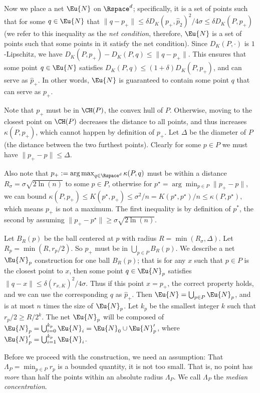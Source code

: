 \documentclass[11pt]{myclass}
\begin{document}
Now we place a net $\Eu{N}$ on $\Rspace^d$; specifically, it is a set of points such that for some $q \in \Eu{N}$ that
$\|q - p_+\| \leq \delta D_K(p_+,\hat p_2)^2/4\sigma \leq \delta D_K(P,p_+)$ (we refer to this inequality as the \emph{net condition}, therefore, $\Eu{N}$ is a set of points such that some points in it satisfy the net condition).  Since $D_K(P,\cdot)$ is $1$-Lipschitz, we have 
$D_K(P, p_+) - D_K(P, q) \leq \|q - p_+ \|$. 
This ensures that some point $q \in \Eu{N}$ satisfies $D_K(P,q) \leq (1+\delta) D_K(P, p_+)$, and can serve as $\hat p_+$.  
In other words, $\Eu{N}$ is guaranteed to contain some point $q$ that can serve as $p_+$.  

Note that $p_+$ must be in $\CH(P)$, the convex hull of $P$.  Otherwise, moving to the closest point on $\CH(P)$ decreases the distance to all points, and thus increases $\kappa(P,p_+)$, which cannot happen by definition of $p_+$.  Let $\Delta$ be the diameter of $P$ (the distance between the two furthest points).  Clearly for some $p \in P$ we must have $\|p_+ - p\| \leq \Delta$.  

Also note that $p_+ : = \arg \max_{q \in \Rspace^d} \kappa(P, q)$ must be within a distance $R_\sigma = \sigma \sqrt{2 \ln(n)}$ to some $p \in P$, otherwise for $p^\star = \arg \min_{p \in P} \|p_+ -p\|$, we can bound
$
\kappa(P,p_+) \leq K(p^\star,p_+) \leq \sigma^2/n = K(p^\star,p^\star)/n \leq \kappa(P,p^\star),
$ which means $p_+$ is not a maximum.  
The first inequality is by definition of $p^*$, the second by assuming $\|p_+ - p^\star\| \geq \sigma \sqrt{2 \ln(n)}$.  


Let $B_R(p)$ be the ball centered at $p$ with radius $R = \min(R_\sigma,\Delta)$.  
Let $R_p = \min(R,r_p/2)$.  
So $p_+$ must be in $\bigcup_{p \in P} B_R(p)$.  
We describe a net $\Eu{N}_p$ construction for one ball $B_R(p)$; that is for any $x$ such that $p \in P$ is the closest point to $x$, then some point $q \in \Eu{N}_p$ satisfies  $\|q-x\| \leq \delta (r_{x,K})^2/4 \sigma$.  Thus if this point $x = p_+$, the correct property holds, and we can use the corresponding $q$ as $\hat p_+$.  
Then $\Eu{N} = \bigcup_{p \in P} \Eu{N}_p$, and is at most $n$ times the size of $\Eu{N}_p$.  
Let $k_p$ be the smallest integer $k$ such that $r_p/2 \geq R/2^k$.  
The net $\Eu{N}_p$ will be composed of $\Eu{N}_p = \bigcup_{i=0}^{k_p} \Eu{N}_i = \Eu{N}_0 \cup \Eu{N}'_p$, where $\Eu{N}'_p = \bigcup_{i=1}^{k_p} \Eu{N}_i$. 

Before we proceed with the construction, we need an assumption:  That $\Lambda_P = \min_{p \in P} r_p$ is a bounded quantity, it is not too small.  That is,  no point has \emph{more} than half the points within an absolute radius $\Lambda_P$.  We call $\Lambda_P$ the \emph{median concentration}.  
\end{document}
